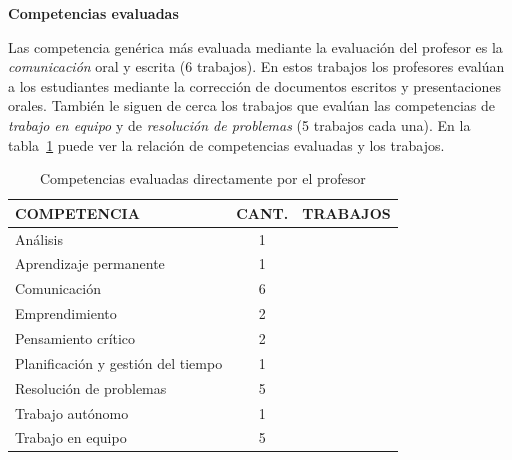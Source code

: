 \bigskip
\textbf{Competencias evaluadas}
\bigskip

Las competencia genérica más evaluada mediante la evaluación del profesor es la \emph{comunicación} oral y escrita (6 trabajos). En estos trabajos los profesores evalúan a los estudiantes mediante la corrección de documentos escritos y presentaciones orales. También le siguen de cerca los trabajos que evalúan las competencias de \emph{trabajo en equipo} y de \emph{resolución de problemas} (5 trabajos cada una). En la tabla~\ref{tab:CompetenciasProfesor} puede ver la relación de competencias evaluadas y los trabajos.

\begin{table}
  \begin{center}
  \begin{tabular}{| m{6cm} | c | m{5cm} |}
    \hline
    COMPETENCIA & CANT. & TRABAJOS\\
    \hline
    \hline
    Análisis & 1 & \cite{aziz2007appraisal} \\
    \hline
    Aprendizaje permanente & 1 & \cite{rashid2008engineering} \\
    \hline
    Comunicación & 6 &  \cite{lacuesta2009active,martin2013acquired,rodriguez2010portfolio,benlloch2007adapting,yang2014fine,rashid2008engineering} \\
    \hline
    Emprendimiento & 2 & \cite{ward2011developing,rashid2008engineering} \\
    \hline
    Pensamiento crítico & 2 & \cite{lacuesta2009active,aziz2007appraisal} \\
    \hline
    Planificación y gestión del tiempo & 1 & \cite{lacuesta2009active} \\
    \hline
    Resolución de problemas & 5 & \cite{martin2013acquired,rodriguez2010portfolio,benlloch2007adapting,vizcarro2013assessment,aziz2007appraisal} \\
    \hline
    Trabajo autónomo & 1 &  \cite{lasa2013problem} \\
    \hline
    Trabajo en equipo & 5 &  \cite{lacuesta2009active,martin2013acquired,rodriguez2010portfolio,benlloch2007adapting,rashid2008engineering} \\
    \hline
  \end{tabular}
\end{center}
\caption{Competencias evaluadas directamente por el profesor}
\label{tab:CompetenciasProfesor}
\end{table}
